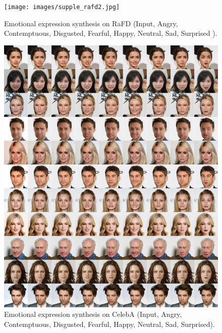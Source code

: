 \documentclass[10pt,twocolumn,letterpaper]{article}
\begin{document}
\begin{figure}[t]
\centering
\centerline{\texttt{[image: images/supple\_rafd2.jpg]}}
\caption{Emotional expression synthesis on RaFD (Input, Angry, Contemptuous, Disgusted, Fearful, Happy, Neutral, Sad, Surprised ).}
\label{figure11}
\end{figure}

\begin{figure}[h]
\centering
\centerline{\includegraphics[width=1.0\linewidth]{images/supple_CelebA_expr.jpg}}
\caption{Emotional expression synthesis on CelebA (Input, Angry, Contemptuous, Disgusted, Fearful, Happy, Neutral, Sad, Surprised).}
\label{figure12}
\end{figure}
\end{document}

